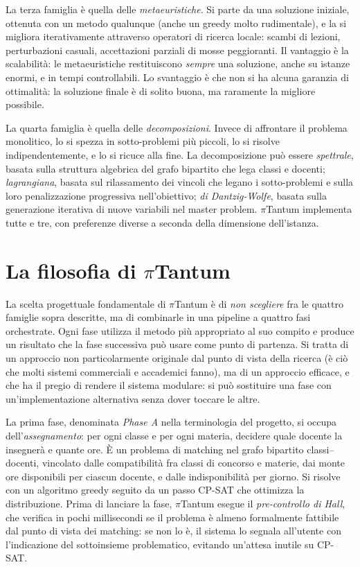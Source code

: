 La terza famiglia \`e quella delle \emph{metaeuristiche}.
Si parte da una soluzione iniziale, ottenuta con un metodo
qualunque (anche un greedy molto rudimentale), e la si
migliora iterativamente attraverso operatori di ricerca
locale: scambi di lezioni, perturbazioni casuali, accettazioni
parziali di mosse peggioranti. Il vantaggio \`e la scalabilit\`a:
le metaeuristiche restituiscono \emph{sempre} una soluzione,
anche su istanze enormi, e in tempi controllabili. Lo
svantaggio \`e che non si ha alcuna garanzia di ottimalit\`a:
la soluzione finale \`e di solito buona, ma raramente la
migliore possibile.

La quarta famiglia \`e quella delle \emph{decomposizioni}.
Invece di affrontare il problema monolitico, lo si spezza in
sotto-problemi pi\`u piccoli, lo si risolve indipendentemente,
e lo si ricuce alla fine. La decomposizione pu\`o essere
\emph{spettrale}, basata sulla struttura algebrica del grafo
bipartito che lega classi e docenti; \emph{lagrangiana},
basata sul rilassamento dei vincoli che legano i sotto-problemi
e sulla loro penalizzazione progressiva nell'obiettivo;
\emph{di Dantzig-Wolfe}, basata sulla generazione iterativa
di nuove variabili nel master problem. $\pi$Tantum implementa
tutte e tre, con preferenze diverse a seconda della
dimensione dell'istanza.

\section{La filosofia di $\pi$Tantum}

La scelta progettuale fondamentale di $\pi$Tantum \`e di
\emph{non scegliere} fra le quattro famiglie sopra descritte,
ma di combinarle in una pipeline a quattro fasi orchestrate.
Ogni fase utilizza il metodo pi\`u appropriato al suo compito
e produce un risultato che la fase successiva pu\`o usare
come punto di partenza. Si tratta di un approccio non
particolarmente originale dal punto di vista della ricerca
(\`e ci\`o che molti sistemi commerciali e accademici fanno),
ma di un approccio efficace, e che ha il pregio di rendere il
sistema modulare: si pu\`o sostituire una fase con
un'implementazione alternativa senza dover toccare le altre.

La prima fase, denominata \emph{Phase A} nella terminologia
del progetto, si occupa dell'\emph{assegnamento}: per ogni
classe e per ogni materia, decidere quale docente la insegner\`a
e quante ore. \`E un problema di matching nel grafo bipartito
classi--docenti, vincolato dalle compatibilit\`a fra classi di
concorso e materie, dai monte ore disponibili per ciascun
docente, e dalle indisponibilit\`a per giorno. Si risolve con
un algoritmo greedy seguito da un passo CP-SAT che ottimizza
la distribuzione. Prima di lanciare la fase, $\pi$Tantum
esegue il \emph{pre-controllo di Hall}, che verifica
in pochi millisecondi se il problema \`e almeno formalmente
fattibile dal punto di vista dei matching: se non lo \`e, il
sistema lo segnala all'utente con l'indicazione del
sottoinsieme problematico, evitando un'attesa inutile su
CP-SAT.

